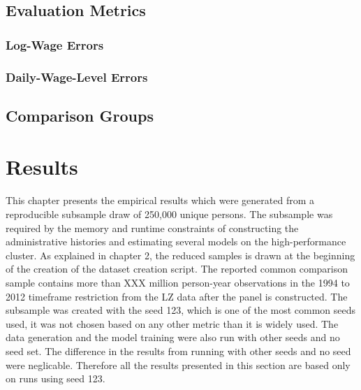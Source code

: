 \documentclass[12pt,a4paper,oneside,titlepage]{book}
\newif\ifthesisdraft
\newcommand{\draftnote}[1]{%
  \ifthesisdraft
    \par\noindent\colorbox{yellow!20}{%
      \parbox{0.94\textwidth}{\textbf{Draft note:} #1}%
    }\par
  \fi
}
\begin{document}
\section{Evaluation Metrics}
\label{sec:metrics}

\subsection{Log-Wage Errors}
\draftnote{Define log RMSE and log MAE. Explain that log errors are multiplicative and are not direct euro errors.}

\subsection{Daily-Wage-Level Errors}
\draftnote{Define wage-level RMSE, MAE, and median absolute error after exponentiating predictions. Explain the sensitivity of wage-level RMSE to extreme high wages.}

\section{Comparison Groups}
\draftnote{Report all, censored, and uncensored observations separately. The censored group is central for judging de-censoring performance.}

\chapter{Results}
\label{ch:results}

This chapter presents the empirical results which were generated from a reproducible subsample draw of 250,000 unique persons. The subsample was required by the memory and runtime constraints of constructing the administrative histories and estimating several models on the high-performance cluster. As explained in chapter 2, the reduced samples is drawn at the beginning of the creation of the dataset creation script. The reported common comparison sample
contains more than XXX million person-year observations in the 1994 to 2012 timeframe restriction from the LZ data after the panel is constructed. The subsample was created with the seed 123, which is one of the most common seeds used, it was not chosen based on any other metric than it is widely used. The data generation and the model training were also run with other seeds and no seed set. The difference in the results from running with other seeds and no seed were neglicable. Therefore all the results presented in this section are based only on runs using seed 123.
\end{document}
